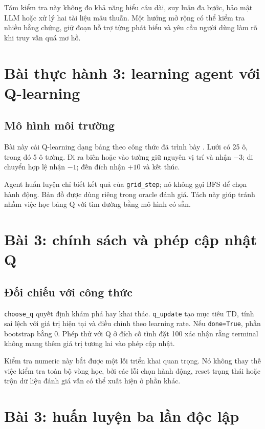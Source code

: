 Tám kiểm tra này không đo khả năng hiểu câu dài, suy luận đa bước, bảo mật LLM hoặc
xử lý hai tài liệu mâu thuẫn. Một hướng mở rộng có thể kiểm tra nhiều bằng chứng,
giữ đoạn hỗ trợ từng phát biểu và yêu cầu người dùng làm rõ khi truy vấn quá mơ hồ.

\newpage
\section{Bài thực hành 3: learning agent với Q-learning}
\subsection{Mô hình môi trường}
Bài này cài Q-learning dạng bảng theo công thức đã trình bày \cite{qlearning}.
Lưới có 25 ô, trong đó 5 ô tường. Đi ra biên hoặc vào tường giữ nguyên vị trí và
nhận $-3$; di chuyển hợp lệ nhận $-1$; đến đích nhận $+10$ và kết thúc.


Agent huấn luyện chỉ biết kết quả của \texttt{grid\_step}; nó không gọi BFS để
chọn hành động. Bản đồ được dùng riêng trong oracle đánh giá. Tách này giúp tránh
nhầm việc học bảng Q với tìm đường bằng mô hình có sẵn.

\newpage
\section*{Bài 3: chính sách và phép cập nhật Q}

\subsection{Đối chiếu với công thức}
\texttt{choose\_q} quyết định khám phá hay khai thác. \texttt{q\_update} tạo mục
tiêu TD, tính sai lệch với giá trị hiện tại và điều chỉnh theo learning rate.
Nếu \texttt{done=True}, phần bootstrap bằng 0. Phép thử với Q ở đích cố tình đặt
100 xác nhận rằng terminal không mang thêm giá trị tương lai vào phép cập nhật.

Kiểm tra numeric này bắt được một lỗi triển khai quan trọng. Nó không thay thế
việc kiểm tra toàn bộ vòng học, bởi các lỗi chọn hành động, reset trạng thái hoặc
trộn dữ liệu đánh giá vẫn có thể xuất hiện ở phần khác.

\newpage
\section*{Bài 3: huấn luyện ba lần độc lập}

